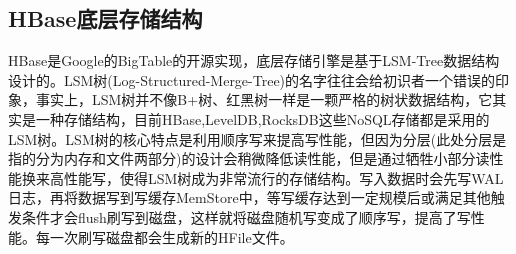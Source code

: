 \documentclass[../../../interview-questions.tex]{subfiles}
\begin{document}
\subsection{HBase底层存储结构}

HBase是Google的BigTable的开源实现，底层存储引擎是基于LSM-Tree数据结构设计的。LSM树(Log-Structured-Merge-Tree)的名字往往会给初识者一个错误的印象，事实上，LSM树并不像B+树、红黑树一样是一颗严格的树状数据结构，它其实是一种存储结构，目前HBase,LevelDB,RocksDB这些NoSQL存储都是采用的LSM树。LSM树的核心特点是利用顺序写来提高写性能，但因为分层(此处分层是指的分为内存和文件两部分)的设计会稍微降低读性能，但是通过牺牲小部分读性能换来高性能写，使得LSM树成为非常流行的存储结构。写入数据时会先写WAL日志，再将数据写到写缓存MemStore中，等写缓存达到一定规模后或满足其他触发条件才会flush刷写到磁盘，这样就将磁盘随机写变成了顺序写，提高了写性能。每一次刷写磁盘都会生成新的HFile文件。
\end{document}
